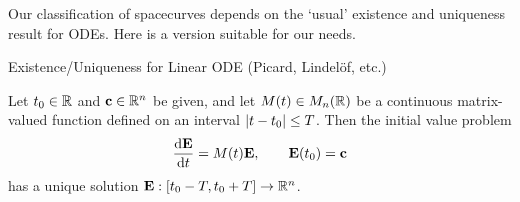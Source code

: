 Our classification of spacecurves depends on the `usual' existence and uniqueness result for ODEs. Here is a version suitable for our needs.
% 
% 
% 
% 
% 

\begin{thm}{Existence/Uniqueness for Linear ODE (Picard, Lindelöf, etc.)}{}\phantom{bob}\par
	Let $t_0\in\R$ and $\vc\in\R^n$ be given, and let $M(t)\in M_n(\R)$ be a continuous matrix-valued function defined on an interval $\nm{t-t_0}\le T$. Then the initial value problem
	\[
		\diff[\vE]{t}=M(t)\vE,\qquad \vE(t_0)=\vc
	\]
	has a unique solution $\vE:[t_0-T,t_0+T]\to \R^n$.
\end{thm}


